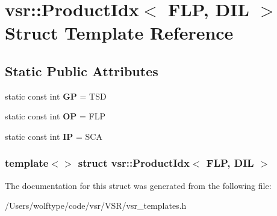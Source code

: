 \hypertarget{structvsr_1_1_product_idx_3_01_f_l_p_00_01_d_i_l_01_4}{\section{vsr\-:\-:Product\-Idx$<$ F\-L\-P, D\-I\-L $>$ Struct Template Reference}
\label{structvsr_1_1_product_idx_3_01_f_l_p_00_01_d_i_l_01_4}
}
\subsection*{Static Public Attributes}
\begin{DoxyCompactItemize}
\item 
\hypertarget{structvsr_1_1_product_idx_3_01_f_l_p_00_01_d_i_l_01_4_a17af673d62298bedeaeefc1c4f398713}{static const int {\bfseries G\-P} = T\-S\-D}\label{structvsr_1_1_product_idx_3_01_f_l_p_00_01_d_i_l_01_4_a17af673d62298bedeaeefc1c4f398713}

\item 
\hypertarget{structvsr_1_1_product_idx_3_01_f_l_p_00_01_d_i_l_01_4_afc0de2f612f801df49db01b8253713a2}{static const int {\bfseries O\-P} = F\-L\-P}\label{structvsr_1_1_product_idx_3_01_f_l_p_00_01_d_i_l_01_4_afc0de2f612f801df49db01b8253713a2}

\item 
\hypertarget{structvsr_1_1_product_idx_3_01_f_l_p_00_01_d_i_l_01_4_a2edf5ca1e1fecd205216e4c09189c9b2}{static const int {\bfseries I\-P} = S\-C\-A}\label{structvsr_1_1_product_idx_3_01_f_l_p_00_01_d_i_l_01_4_a2edf5ca1e1fecd205216e4c09189c9b2}

\end{DoxyCompactItemize}
\subsubsection*{template$<$$>$ struct vsr\-::\-Product\-Idx$<$ F\-L\-P, D\-I\-L $>$}



The documentation for this struct was generated from the following file\-:\begin{DoxyCompactItemize}
\item 
/\-Users/wolftype/code/vsr/\-V\-S\-R/vsr\-\_\-templates.\-h\end{DoxyCompactItemize}
